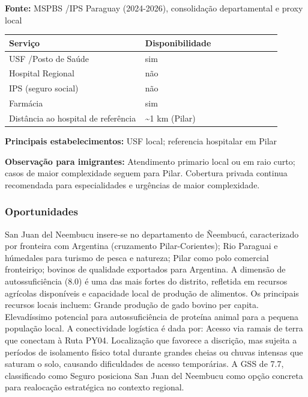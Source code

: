 \textbf{Fonte:} MSPBS /\allowbreak  IPS Paraguay (2024-2026), consolidação
departamental e proxy local

{\def\LTcaptype{none} %
\begin{longtable}{@{}>{\raggedright\arraybackslash}p{0.45\linewidth} >{\raggedright\arraybackslash}p{0.45\linewidth}@{}}
\toprule\noalign{}
Serviço & Disponibilidade \\
\midrule\noalign{}
\endhead
\bottomrule\noalign{}
\endlastfoot
USF /\allowbreak  Posto de Saúde & sim \\
Hospital Regional & não \\
IPS (seguro social) & não \\
Farmácia & sim \\
Distância ao hospital de referência & \textasciitilde1 km (Pilar) \\
\end{longtable}
}

\textbf{Principais estabelecimentos:} USF local; referencia hospitalar
em Pilar

\textbf{Observação para imigrantes:} Atendimento primario local ou em
raio curto; casos de maior complexidade seguem para Pilar. Cobertura
privada continua recomendada para especialidades e urgências de maior
complexidade.
\newpage

\subsubsection*{Oportunidades}\label{oport-san-juan-del-neembucu-1212}
San Juan del Neembucu insere-se no departamento de Ñeembucú, caracterizado por fronteira com Argentina (cruzamento Pilar-Corientes); Rio Paraguai e húmedales para turismo de pesca e natureza; Pilar como polo comercial fronteiriço; bovinos de qualidade exportados para Argentina. A dimensão de autossuficiência (8.0) é uma das mais fortes do distrito, refletida em recursos agrícolas disponíveis e capacidade local de produção de alimentos. Os principais recursos locais incluem: Grande produção de gado bovino per capita. Elevadíssimo potencial para autossuficiência de proteína animal para a pequena população local. A conectividade logística é dada por: Acesso via ramais de terra que conectam à Ruta PY04. Localização que favorece a discrição, mas sujeita a períodos de isolamento físico total durante grandes cheias ou chuvas intensas que saturam o solo, causando dificuldades de acesso temporárias. A GSS de 7.7, classificado como Seguro posiciona San Juan del Neembucu como opção concreta para realocação estratégica no contexto regional.

